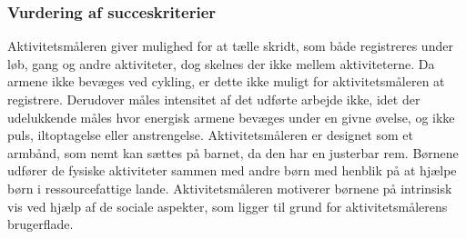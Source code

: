 %

\subsubsection{Vurdering af succeskriterier}
Aktivitetsmåleren giver mulighed for at tælle skridt, som både registreres under løb, gang og andre aktiviteter, dog skelnes der ikke mellem aktiviteterne. Da armene ikke bevæges ved cykling, er dette ikke muligt for aktivitetsmåleren at registrere. Derudover måles intensitet af det udførte arbejde ikke, idet der udelukkende måles hvor energisk armene bevæges under en givne øvelse, og ikke puls, iltoptagelse eller anstrengelse. Aktivitetsmåleren er designet som et armbånd, som nemt kan sættes på barnet, da den har en justerbar rem. \citep{PowerManual2015} \newline
Børnene udfører de fysiske aktiviteter sammen med andre børn med henblik på at hjælpe børn i ressourcefattige lande. Aktivitetsmåleren motiverer børnene på intrinsisk vis ved hjælp af de sociale aspekter, som ligger til grund for aktivitetsmålerens brugerflade.
\citep{PowerAbout2015} 

